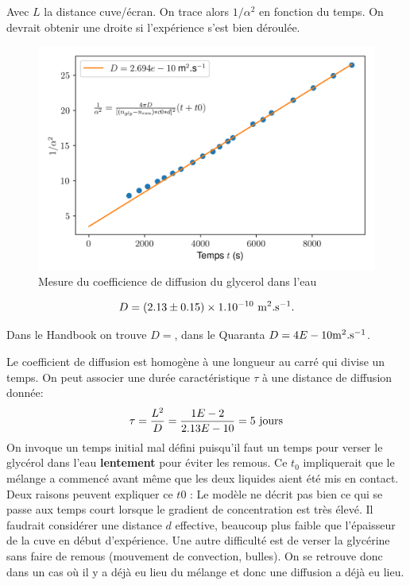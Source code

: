 \documentclass[french]{article}
\begin{document}
Avec $L$ la distance cuve/écran. On trace alors $1/\alpha^2$ en fonction du temps. On devrait obtenir une droite si l'expérience s'est bien déroulée.

\begin{figure}[ht]
	\centering
	\includegraphics*[width = .6\textwidth]{DiffusionDuGlycerol.png}
	\caption{Mesure du coefficience de diffusion du glycerol dans l'eau}
\end{figure}

\begin{equation}
	D = (2.13\pm 0.15) \times 1.10^{-10}~\rm m^2.s^{-1}.
\end{equation}

Dans le Handbook on trouve $D = $, dans le Quaranta $D=4E-10\rm m^2.s^{-1}$.

Le coefficient de diffusion est homogène à une longueur au carré qui divise un temps. On peut associer une durée caractéristique $\tau$ à une distance de diffusion donnée: 
\begin{equation}
	\tau = \dfrac{L^2}{D} = \dfrac{1E-2}{2.13E-10} = 5 \rm~jours 
\end{equation}
On invoque un temps initial mal défini puisqu'il faut un temps pour verser le glycérol dans l'eau \textbf{lentement} pour éviter les remous. Ce $t_0$ impliquerait que le mélange a commencé avant même que les deux liquides aient été mis en contact. Deux raisons peuvent expliquer ce $t0$ : Le modèle ne décrit pas bien ce qui se passe aux temps court lorsque le gradient de concentration est très élevé. Il faudrait considérer une distance $d$ effective, beaucoup plus faible que l'épaisseur de la cuve en début d'expérience. Une autre difficulté est de verser la glycérine sans faire de remous (mouvement de convection, bulles). On se retrouve donc dans un cas où il y a déjà eu lieu du mélange et donc une diffusion a déjà eu lieu. 
\end{document}
